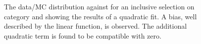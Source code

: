 \begin{figure}[h!]
  \centering
  ~~
  \\
  ~~
  \\
  \caption{\label{fig:linearMotiv} 
  The data/MC distribution against \mht for an inclusive selection on category and \scalht
  showing the results of a quadratic fit. A bias, well described by the linear function, 
  is observed. The additional quadratic term is found to be compatible with zero.}
\end{figure}

